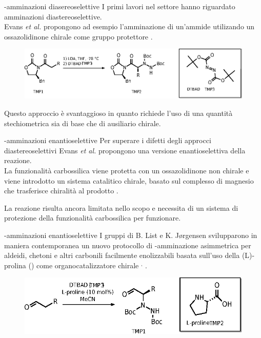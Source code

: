 \documentclass[10pt]{beamer}
\begin{document}
\begin{frame}[fragile]{{\textalpha}-amminazioni diasereoselettive}
I primi lavori nel settore hanno riguardato \alert{amminazioni diastereoselettive}.\\
Evans \textit{et al.} propongono ad esempio l'amminazione di un'ammide utilizando un ossazolidinone chirale come gruppo protettore .\\ 
\begin{figure}[H] 
	\centering
	\includegraphics[scale=0.7]{P_diastereoevans.eps}
\end{figure}  
Questo approccio è svantaggioso in quanto richiede l'uso di una quantità \alert{stechiometrica} sia di base che di \alert{ausiliario chirale}.

\end{frame}

\begin{frame}[fragile]{{\textalpha}-amminazioni enantioselettive}
Per superare i difetti degli approcci diastereoselettivi Evans \textit{et al.} propongono una \alert{versione enantioselettiva} della reazione.\\
La funzionalità carbossilica viene protetta con un ossazolidinone non chirale e viene introdotto \alert{un sistema catalitico chirale}, basato sul complesso di magnesio  che trasferisce chiralità al prodotto .

La reazione risulta ancora limitata nello scopo e necessita di un sistema di protezione della funzionalità carbossilica per funzionare.
\end{frame}

\begin{frame}[fragile]{{\textalpha}-amminazioni enantioselettive}
I gruppi di B. List e K. J\o rgensen svilupparono in maniera contemporanea un nuovo protocollo di \textalpha-amminazione asimmetrica per \alert{aldeidi, chetoni} e altri carbonili facilmente enolizzabili basata sull'uso della \alert{(L)-prolina} () come organocatalizzatore chirale $^,$ .
\begin{figure}[H] 
	\centering
	\includegraphics[scale=0.7]{P_listorganoaaa.eps}
\end{figure}  
\end{frame}
\end{document}
